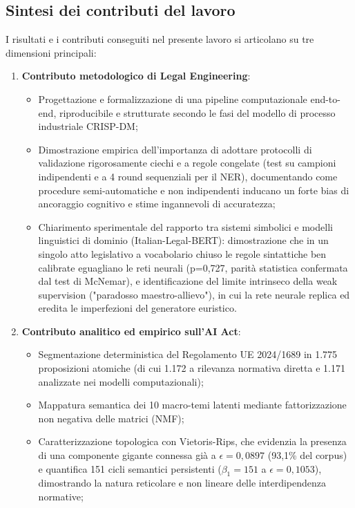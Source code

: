 \documentclass[12pt,a4paper,oneside]{report}
\begin{document}
\subsection{Sintesi dei contributi del lavoro}
I risultati e i contributi conseguiti nel presente lavoro si articolano su tre dimensioni principali:
\begin{enumerate}
    \item \textbf{Contributo metodologico di Legal Engineering}:
    \begin{itemize}
        \item Progettazione e formalizzazione di una pipeline computazionale end-to-end, riproducibile e strutturate secondo le fasi del modello di processo industriale CRISP-DM;
        \item Dimostrazione empirica dell'importanza di adottare protocolli di validazione rigorosamente ciechi e a regole congelate (test su campioni indipendenti e a 4 round sequenziali per il NER), documentando come procedure semi-automatiche e non indipendenti inducano un forte bias di ancoraggio cognitivo e stime ingannevoli di accuratezza;
        \item Chiarimento sperimentale del rapporto tra sistemi simbolici e modelli linguistici di dominio (Italian-Legal-BERT): dimostrazione che  in un singolo atto legislativo a vocabolario chiuso le regole sintattiche ben calibrate eguagliano le reti neurali (p=0,727, parità statistica confermata dal test di McNemar), e identificazione del limite intrinseco della weak supervision ("paradosso maestro-allievo"), in cui la rete neurale replica ed eredita le imperfezioni del generatore euristico.
    \end{itemize}
    \item \textbf{Contributo analitico ed empirico sull'AI Act}:
    \begin{itemize}
        \item Segmentazione deterministica del Regolamento UE 2024/1689 in 1.775 proposizioni atomiche (di cui 1.172 a rilevanza normativa diretta e 1.171 analizzate nei modelli computazionali);
        \item Mappatura semantica dei 10 macro-temi latenti mediante fattorizzazione non negativa delle matrici (NMF);
        \item Caratterizzazione topologica con Vietoris-Rips, che evidenzia la presenza di una componente gigante connessa già a $\epsilon = 0,0897$ (93,1\% del corpus) e quantifica 151 cicli semantici persistenti ($\beta_1 = 151$ a $\epsilon = 0,1053$), dimostrando la natura reticolare e non lineare delle interdipendenza normative;

\end{itemize}
\end{enumerate}
\end{document}

